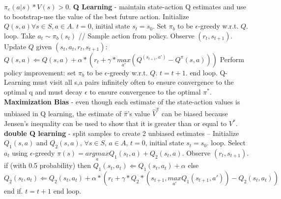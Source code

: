 \documentclass{article}
\begin{document}
\begin{itemize}
$\pi_e(a|s)*V(s) > 0$. \textbf{Q Learning} - maintain state-action Q estimates and use to bootstrap-use the value of the best future action. Initialize $Q(s, a) \forall s \in S, a \in A$. $t = 0$, initial state $s_t = s_0$. Set $\pi_b$ to be $\epsilon$-greedy w.r.t. $Q$. loop. Take $a_t \sim \pi_b(s_t)$ // Sample action from policy. Observe $(r_t, s_{t+1})$. Update $Q$ given $(s_t, a_t, r_t, s_{t+1})$: $Q(s, a) \Leftarrow Q(s, a) + \alpha*(r_t + \gamma*\underset{a'}{max}(Q^(s_{t+1}, a') - Q^\pi(s, a)))$ Perform policy improvement: set $\pi_b$ to be $\epsilon$-greedy w.r.t. $Q$. $t = t + 1$. end loop. Q-Learning must visit all s,a pairs infinitely often to ensure convergence to the optimal q and must decay $\epsilon$ to ensure convergence to the optimal $\pi^*$. \textbf{Maximization Bias} - even though each estimate of the state-action values is unbiased in Q learning, the estimate of $\hat{\pi}$'s value $\hat{V}^{\hat{\pi}}$ can be biased because Jensen's inequality can be used to show that it is greater than or equal to $V^*$. \textbf{double Q learning} - split samples to create 2 unbiased estimates -- Initialize $Q_1(s, a)$ and $Q_2(s, a)$, $\forall s \in S$, $a \in A$, $t = 0$, initial state $s_t = s_0$. loop. Select $a_t$ using $\epsilon$-greedy $\pi(s) = \underset{a}{argmax} Q_1(s_t, a) + Q_2(s_t, a)$. Observe $(r_t, s_{t+1})$. if (with 0.5 probability) then $Q_1(s_t, a_t) \Leftarrow Q_1(s_t, a_t) + \alpha$ else $Q_2(s_t, a_t) \Leftarrow Q_2(s_t, a_t) + \alpha*(r_t + \gamma*Q_2*(s_{t+1}, \underset{a'}{max} Q_1(s_{t+1}, a')) - Q_2(s_t, a_t))$ end if. $t = t + 1$ end loop. 

\end{itemize}
\end{document}
